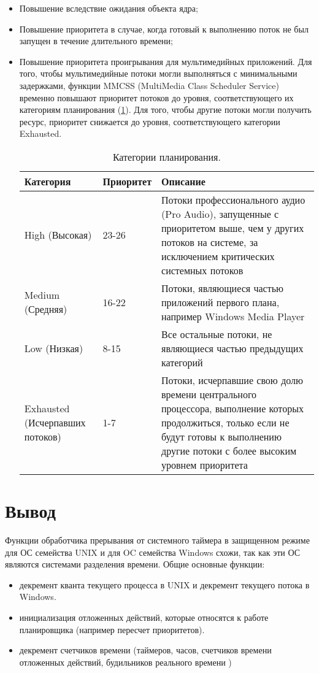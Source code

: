 \begin{itemize}
	\item  Повышение вследствие ожидания объекта ядра;
	
	\item Повышение приоритета в случае, когда готовый к выполнению поток не был запущен в течение длительного времени;
	
	\item Повышение приоритета проигрывания для мультимедийных приложений. Для того, чтобы мультимедийные потоки могли выполняться с минимальными задержками, функции MMCSS (MultiMedia Class Scheduler Service) временно повышают приоритет потоков до уровня, соответствующего их категориям планирования (\ref{tab:plan}). Для того, чтобы другие потоки могли получить ресурс, приоритет снижается до уровня, соответствующего категории Exhausted.

\begin{table}[h]
	\caption{Категории планирования.}
	\begin{center}
		\begin{tabular}{|p{40mm}|p{30mm}|p{80mm}|}
			\hline
			\textbf{Категория} & \textbf{Приоритет} & \textbf{Описание} \\
			\hline
			High (Высокая) & 23-26 & Потоки профессионального аудио (Pro Audio), запущенные с приоритетом выше, чем у других потоков на системе, за исключением критических системных потоков \\
			\hline
			Medium (Средняя) & 16-22 & Потоки, являющиеся частью приложений первого плана, например Windows Media Player \\
			\hline
			Low (Низкая) & 8-15 & Все остальные потоки, не являющиеся частью предыдущих категорий \\
			\hline
			Exhausted (Исчерпавших потоков) & 1-7 & Потоки, исчерпавшие свою долю времени центрального процессора, выполнение которых продолжиться, только если не будут готовы к выполнению другие потоки с более высоким уровнем приоритета \\
			\hline
		\end{tabular}
	\end{center}
	\label{tab:plan}
\end{table}
\end{itemize}

\chapter{Вывод}
Функции обработчика прерывания от системного таймера в защищенном режиме для ОС семейства UNIX и для OC семейства Windows схожи, так как эти ОС являются системами разделения времени. Общие основные функции:
\begin{itemize}
	\item декремент кванта текущего процесса в UNIX и декремент текущего потока в Windows.
	\item инициализация отложенных действий, которые относятся к работе планировщика (например пересчет приоритетов).
	\item декремент счетчиков времени (таймеров, часов, счетчиков времени отложенных действий, будильников реального времени ) 
\end{itemize}

